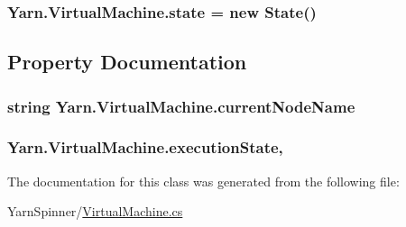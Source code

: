 \hypertarget{a00136_a70f2ce6201cdd2430ceaa764ac614ca0}{
\subsubsection[{state}]{ Yarn.\-Virtual\-Machine.\-state = new {\bf State}()\hspace{0.3cm}{\ttfamily [private]}}}\label{a00136_a70f2ce6201cdd2430ceaa764ac614ca0}


\subsection{Property Documentation}
\hypertarget{a00136_ab3afe8360a344c16c21213edb3641481}{
\subsubsection[{current\-Node\-Name}]{\setlength{\rightskip}{0pt plus 5cm}string Yarn.\-Virtual\-Machine.\-current\-Node\-Name\hspace{0.3cm}{\ttfamily [get]}}}\label{a00136_ab3afe8360a344c16c21213edb3641481}
\hypertarget{a00136_a66491da06023dabfb63d09e6ccbba74f}{
\subsubsection[{execution\-State}]{ Yarn.\-Virtual\-Machine.\-execution\-State\hspace{0.3cm}{\ttfamily [get]}, {\ttfamily [set]}}}\label{a00136_a66491da06023dabfb63d09e6ccbba74f}


The documentation for this class was generated from the following file\-:\begin{DoxyCompactItemize}
\item 
Yarn\-Spinner/\hyperlink{a00268}{Virtual\-Machine.\-cs}\end{DoxyCompactItemize}
